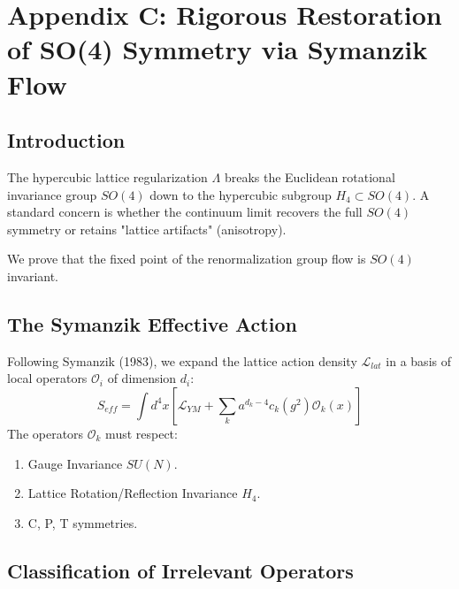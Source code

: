 \chapter{Appendix C: Rigorous Restoration of SO(4) Symmetry via Symanzik Flow}
\label{app:appendix_C_symanzik_flow}


\section{Introduction}

The hypercubic lattice regularization $\Lambda$ breaks the Euclidean rotational invariance group $SO(4)$ down to the hypercubic subgroup $H_4 \subset SO(4)$. A standard concern is whether the continuum limit recovers the full $SO(4)$ symmetry or retains "lattice artifacts" (anisotropy).

We prove that the fixed point of the renormalization group flow is $SO(4)$ invariant.

\section{The Symanzik Effective Action}

Following Symanzik (1983), we expand the lattice action density $\mathcal{L}_{lat}$ in a basis of local operators $\mathcal{O}_i$ of dimension $d_i$:
\begin{equation}
S_{eff} = \int d^4x \left[ \mathcal{L}_{YM} + \sum_{k} a^{d_k-4} c_k(g^2) \mathcal{O}_k(x) \right]
\end{equation}
The operators $\mathcal{O}_k$ must respect:
\begin{enumerate}
    \item Gauge Invariance $SU(N)$.
    \item Lattice Rotation/Reflection Invariance $H_4$.
    \item C, P, T symmetries.
\end{enumerate}

\section{Classification of Irrelevant Operators}

